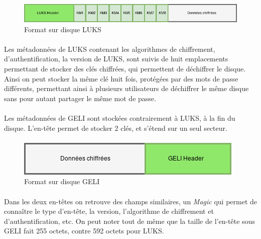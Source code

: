 \paragraph{}
\begin{figure}[h]
\centering
\includegraphics[width=.8\linewidth]{etat_art/format_disque_luks.png}
\caption{\label{fig:LUKSFormat}Format sur disque LUKS}
\end{figure}

\paragraph{}
Les métadonnées de LUKS contenant les algorithmes de chiffrement, 
d'authentification, la version de LUKS, sont suivis de huit emplacements 
permettant de stocker des clés chiffrées, qui permettent de déchiffrer le 
disque. Ainsi on peut stocker la même clé huit fois, protégées par des mots de 
passe différents, permettant ainsi à plusieurs utilisateurs de déchiffrer le 
même disque sans pour autant partager le même mot de passe.

\paragraph{}
Les métadonnées de GELI sont stockées contrairement à LUKS, à la fin du disque.
L'en-tête permet de stocker 2 clés, et s'étend sur un seul secteur.


\paragraph{}
\begin{figure}[h]
\centering
\includegraphics[width=.5\linewidth]{etat_art/format_disque_geli.png}
\caption{\label{fig:GELIFormat}Format sur disque GELI}
\end{figure}

\paragraph{}
Dans les deux en-têtes on retrouve des champs similaires, un {\em Magic} qui 
permet de connaître le type d'en-tête, la version, l'algorithme de chiffrement 
et d'authentification, etc. On peut noter tout de même que la taille de 
l'en-tête sous GELI fait 255 octets, contre 592 octets pour LUKS.



